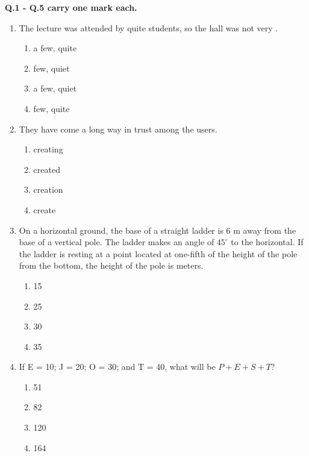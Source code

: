 \documentclass[12pt]{article}
\begin{document}
\noindent\textbf{Q.1 - Q.5 carry one mark each.}\\
\begin{enumerate}[label = Q.\arabic*]
	\item The lecture was attended by quite \underline{\hspace{1cm}} students, so the hall was not very \underline{\hspace{1cm}}.
		\begin{multicols}{4}
			\begin{enumerate}[label=(\Alph*)]
				\item a few, quite
				\item few, quiet
				\item a few, quiet
				\item few, quite
			\end{enumerate}
		\end{multicols}

	\item They have come a long way in \underline{\hspace{2cm}} trust among the users.
		\begin{multicols}{4}
			\begin{enumerate}[label=(\Alph*)]
				\item creating
				\item created
				\item creation
				\item create
			\end{enumerate}
		\end{multicols}

	\item On a horizontal ground, the base of a straight ladder is 6 m away from the base of a vertical pole. The ladder makes an angle of $45^\circ$ to the horizontal. If the ladder is resting at a point located at one-fifth of the height of the pole from the bottom, the height of the pole is \underline{\hspace{1cm}} meters.
		\begin{multicols}{4}
			\begin{enumerate}[label=(\Alph*)]
				\item 15
				\item 25
				\item 30
				\item 35
			\end{enumerate}
		\end{multicols}

	\item If E = 10; J = 20; O = 30; and T = 40, what will be $P + E + S + T$?
		\begin{multicols}{4}
			\begin{enumerate}[label=(\Alph*)]
				\item 51
				\item 82
				\item 120
				\item 164
			\end{enumerate}
		\end{multicols}


\end{enumerate}
\end{document}
